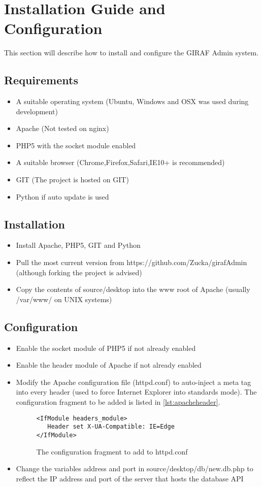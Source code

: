 \chapter{Installation Guide and Configuration}
\label{chap:installGuide}
This section will describe how to install and configure the GIRAF Admin system. 
\section{Requirements}
\begin{itemize}
\item A suitable operating system (Ubuntu, Windows and OSX was used during development)
\item Apache (Not tested on nginx)
\item PHP5 with the socket module enabled
\item A suitable browser (Chrome,Firefox,Safari,IE10+ is recommended)
\item GIT (The project is hosted on GIT)
\item Python if auto update is used
\end{itemize}
\section{Installation}
\begin{itemize}
\item Install Apache, PHP5, GIT and Python
\item Pull the most current version from https://github.com/Zucka/girafAdmin (although forking the project is advised)
\item Copy the contents of source/desktop into the www root of Apache (usually /var/www/ on UNIX systems)
\end{itemize}
\section{Configuration}
\begin{itemize}
\item Enable the socket module of PHP5 if not already enabled
\item Enable the header module of Apache if not already enabled
\item Modify the Apache configuration file (httpd.conf) to auto-inject a meta tag into every header (used to force Internet Explorer into standards mode). The configuration fragment to be added is listed in \autoref{lst:apacheheader}. 
\begin{figure}[htbp]
\begin{lstlisting}
<IfModule headers_module>
   Header set X-UA-Compatible: IE=Edge
</IfModule>
\end{lstlisting}
\caption{The configuration fragment to add to httpd.conf}
\label{lst:apacheheader}
\end{figure}
\item Change the variables address and port in source/desktop/db/new.db.php to reflect the IP address and port of the server that hosts the database API
\end{itemize}
